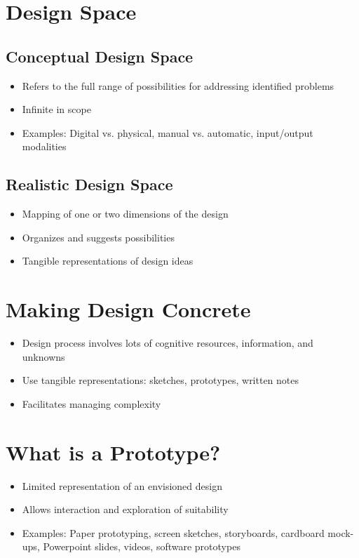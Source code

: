 \documentclass{article}
\begin{document}
\section{Design Space}
\subsection{Conceptual Design Space}
\begin{itemize}
    \item Refers to the full range of possibilities for addressing identified problems
    \item Infinite in scope
    \item Examples: Digital vs. physical, manual vs. automatic, input/output modalities
\end{itemize}

\subsection{Realistic Design Space}
\begin{itemize}
    \item Mapping of one or two dimensions of the design
    \item Organizes and suggests possibilities
    \item Tangible representations of design ideas
\end{itemize}

\section{Making Design Concrete}
\begin{itemize}
    \item Design process involves lots of cognitive resources, information, and unknowns
    \item Use tangible representations: sketches, prototypes, written notes
    \item Facilitates managing complexity
\end{itemize}

\section{What is a Prototype?}
\begin{itemize}
    \item Limited representation of an envisioned design
    \item Allows interaction and exploration of suitability
    \item Examples: Paper prototyping, screen sketches, storyboards, cardboard mock-ups, Powerpoint slides, videos, software prototypes
\end{itemize}
\end{document}
